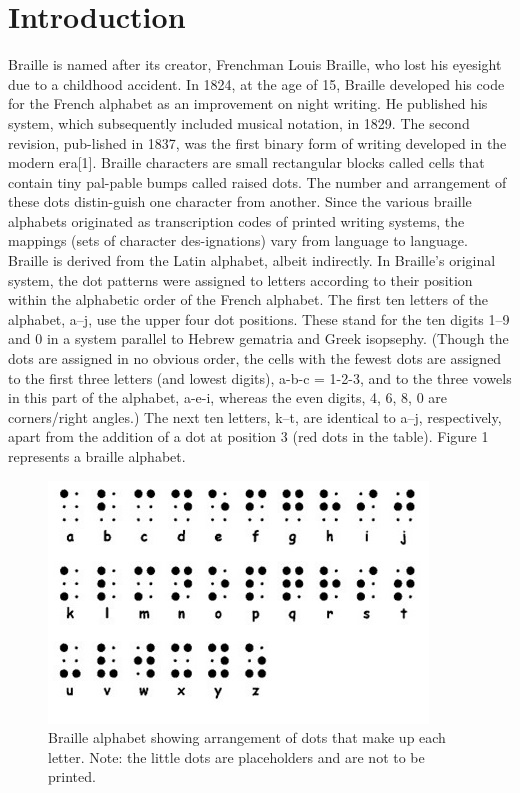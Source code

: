 \documentclass[journal,article,submit,moreauthors,pdftex,10pt,a4paper]{mdpi}
\begin{document}

\setcounter{section}{0} %

\section{Introduction}

Braille is named after its creator, Frenchman Louis Braille, who lost his eyesight due to a childhood accident. In 1824, at the age of 15, Braille developed his code for the French alphabet as an improvement on night writing. He published his system, which subsequently included musical notation, in 1829. The second revision, pub-lished in 1837, was the first binary form of writing developed in the modern era[1].
Braille characters are small rectangular blocks called cells that contain tiny pal-pable bumps called raised dots. The number and arrangement of these dots distin-guish one character from another. Since the various braille alphabets originated as transcription codes of printed writing systems, the mappings (sets of character des-ignations) vary from language to language.
Braille is derived from the Latin alphabet, albeit indirectly. In Braille's original system, the dot patterns were assigned to letters according to their position within the alphabetic order of the French alphabet. The first ten letters of the alphabet, a–j, use the upper four dot positions. These stand for the ten digits 1–9 and 0 in a system parallel to Hebrew gematria and Greek isopsephy. (Though the dots are assigned in no obvious order, the cells with the fewest dots are assigned to the first three letters (and lowest digits), a-b-c = 1-2-3, and to the three vowels in this part of the alphabet, a-e-i, whereas the even digits, 4, 6, 8, 0 are corners/right angles.) The next ten letters, k–t, are identical to a–j, respectively, apart from the addition of a dot at position 3 (red dots in the table). Figure 1 represents a braille alphabet.

\begin{figure}[H]
\centering
\includegraphics[width=10 cm]{Braiile-Alphabet.jpg}
\caption{Braille alphabet showing arrangement of dots that make up each letter. Note: the little dots are placeholders and are not to be printed.}
\end{figure} 
 
\end{document}
